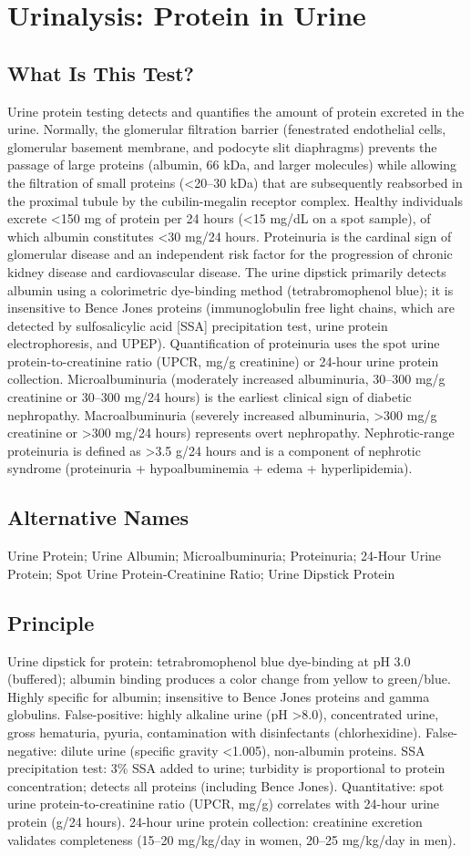 \chapter{Urinalysis: Protein in Urine}
\section*{What Is This Test?}
Urine protein testing detects and quantifies the amount of protein excreted in the urine. Normally, the glomerular filtration barrier (fenestrated endothelial cells, glomerular basement membrane, and podocyte slit diaphragms) prevents the passage of large proteins (albumin, 66 kDa, and larger molecules) while allowing the filtration of small proteins (<20--30 kDa) that are subsequently reabsorbed in the proximal tubule by the cubilin-megalin receptor complex. Healthy individuals excrete <150 mg of protein per 24 hours (<15 mg/dL on a spot sample), of which albumin constitutes <30 mg/24 hours. Proteinuria is the cardinal sign of glomerular disease and an independent risk factor for the progression of chronic kidney disease and cardiovascular disease. The urine dipstick primarily detects albumin using a colorimetric dye-binding method (tetrabromophenol blue); it is insensitive to Bence Jones proteins (immunoglobulin free light chains, which are detected by sulfosalicylic acid [SSA] precipitation test, urine protein electrophoresis, and UPEP). Quantification of proteinuria uses the spot urine protein-to-creatinine ratio (UPCR, mg/g creatinine) or 24-hour urine protein collection. Microalbuminuria (moderately increased albuminuria, 30--300 mg/g creatinine or 30--300 mg/24 hours) is the earliest clinical sign of diabetic nephropathy. Macroalbuminuria (severely increased albuminuria, >300 mg/g creatinine or >300 mg/24 hours) represents overt nephropathy. Nephrotic-range proteinuria is defined as >3.5 g/24 hours and is a component of nephrotic syndrome (proteinuria + hypoalbuminemia + edema + hyperlipidemia).
\section*{Alternative Names}
Urine Protein; Urine Albumin; Microalbuminuria; Proteinuria; 24-Hour Urine Protein; Spot Urine Protein-Creatinine Ratio; Urine Dipstick Protein
\section*{Principle}
Urine dipstick for protein: tetrabromophenol blue dye-binding at pH 3.0 (buffered); albumin binding produces a color change from yellow to green/blue. Highly specific for albumin; insensitive to Bence Jones proteins and gamma globulins. False-positive: highly alkaline urine (pH >8.0), concentrated urine, gross hematuria, pyuria, contamination with disinfectants (chlorhexidine). False-negative: dilute urine (specific gravity <1.005), non-albumin proteins. SSA precipitation test: 3\% SSA added to urine; turbidity is proportional to protein concentration; detects all proteins (including Bence Jones). Quantitative: spot urine protein-to-creatinine ratio (UPCR, mg/g) correlates with 24-hour urine protein (g/24 hours). 24-hour urine protein collection: creatinine excretion validates completeness (15--20 mg/kg/day in women, 20--25 mg/kg/day in men).
